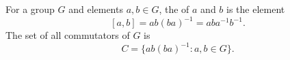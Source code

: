 For a group $G$ and elements $a, b \in G$, the  of $a$ and $b$ is the element
$$
[a, b] = ab(ba)^{-1} = aba^{-1}b^{-1}.
$$
The set of all commutators of $G$ is
$$
C = \{ab(ba)^{-1} : a, b \in G\}.
$$
